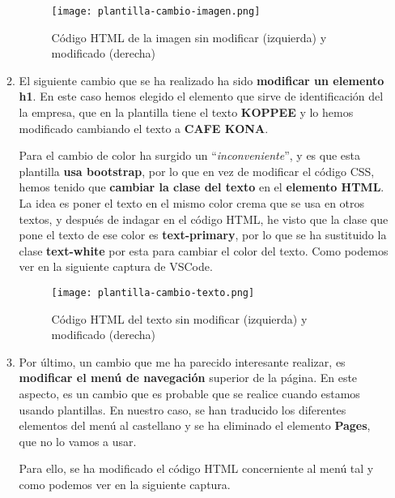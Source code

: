 \begin{itemize}
\begin{enumerate}
        \begin{figure}[H]
            \centering
            \texttt{[image: plantilla-cambio-imagen.png]}
            \caption{Código HTML de la imagen sin modificar (izquierda) y modificado (derecha)}
        \end{figure}

        \item El siguiente cambio que se ha realizado ha sido \textbf{modificar un elemento h1}. En este caso hemos elegido el elemento que sirve de identificación del la empresa, que en la plantilla tiene el texto \textbf{KOPPEE} y lo hemos modificado cambiando el texto a \textbf{CAFE KONA}.

        Para el cambio de color ha surgido un ``\textit{inconveniente}'', y es que esta plantilla \textbf{usa bootstrap}, por lo que en vez de modificar el código CSS, hemos tenido que \textbf{cambiar la clase del texto} en el \textbf{elemento HTML}. La idea es poner el texto en el mismo color crema que se usa en otros textos, y después de indagar en el código HTML, he visto que la clase que pone el texto de ese color es \textbf{text-primary}, por lo que se ha sustituido la clase \textbf{text-white} por esta para cambiar el color del texto. Como podemos ver en la siguiente captura de VSCode.

        \begin{figure}[H]
            \centering
            \texttt{[image: plantilla-cambio-texto.png]}
            \caption{Código HTML del texto sin modificar (izquierda) y modificado (derecha)}
        \end{figure}

        \item Por último, un cambio que me ha parecido interesante realizar, es \textbf{modificar el menú de navegación} superior de la página. En este aspecto, es un cambio que es probable que se realice cuando estamos usando plantillas. En nuestro caso, se han traducido los diferentes elementos del menú al castellano y se ha eliminado el elemento \textbf{Pages}, que no lo vamos a usar.

        Para ello, se ha modificado el código HTML concerniente al menú tal y como podemos ver en la siguiente captura.
    \end{enumerate}
\end{itemize}






%
%

